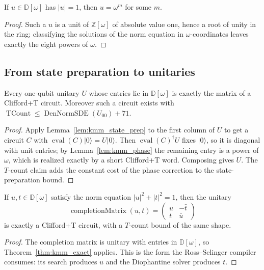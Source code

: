 \begin{lemma}
  \label{lem:kmm_phase}
  \leanok
  If $u \in \mathbb{D}[\omega]$ has $\lvert u\rvert = 1$, then $u = \omega^{m}$
  for some $m$.
\end{lemma}

\begin{proof}
  \leanok
  Such a $u$ is a unit of $\mathbb{Z}[\omega]$ of absolute value one, hence a
  root of unity in the ring; classifying the solutions of the norm equation in
  $\omega$-coordinates leaves exactly the eight powers of $\omega$.
\end{proof}

\subsection{From state preparation to unitaries}

\begin{theorem}
  \label{thm:kmm_exact}
  \leanok
  Every one-qubit unitary $U$ whose entries lie in $\mathbb{D}[\omega]$ is
  exactly the matrix of a Clifford+T circuit.  Moreover such a circuit exists
  with $\operatorname{TCount} \le \operatorname{DenNormSDE}(U_{00}) + 71$.
\end{theorem}

\begin{proof}
  \leanok
  Apply Lemma~\ref{lem:kmm_state_prep} to the first column of $U$ to get a
  circuit $C$ with $\operatorname{eval}(C)\lvert 0\rangle = U\lvert 0\rangle$.
  Then $\operatorname{eval}(C)^{\dagger} U$ fixes $\lvert 0\rangle$, so it is
  diagonal with unit entries; by Lemma~\ref{lem:kmm_phase} the remaining entry
  is a power of $\omega$, which is realized exactly by a short Clifford+T word.
  Composing gives $U$.  The $T$-count claim adds the constant cost of the phase
  correction to the state-preparation bound.
\end{proof}

\begin{theorem}
  \label{thm:kmm_completion}
  \leanok
  If $u, t \in \mathbb{D}[\omega]$ satisfy the norm equation
  $\lvert u\rvert^2 + \lvert t\rvert^2 = 1$, then the unitary
  \[
    \operatorname{completionMatrix}(u,t)
      = \begin{pmatrix} u & -\bar t \\ t & \bar u\end{pmatrix}
  \]
  is exactly a Clifford+T circuit, with a $T$-count bound of the same shape.
\end{theorem}

\begin{proof}
  \leanok
  The completion matrix is unitary with entries in $\mathbb{D}[\omega]$, so
  Theorem~\ref{thm:kmm_exact} applies.  This is the form the Ross--Selinger
  compiler consumes: its search produces $u$ and the Diophantine solver
  produces $t$.
\end{proof}
